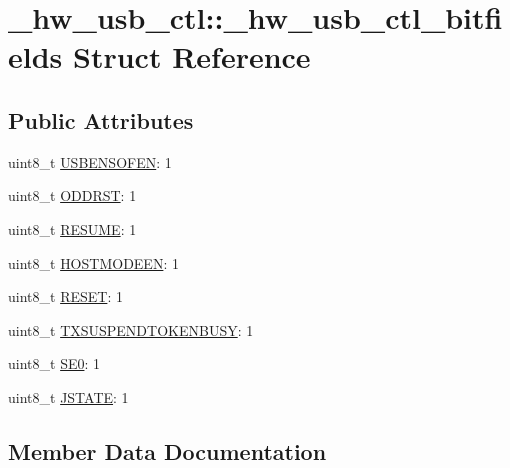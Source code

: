 \hypertarget{struct__hw__usb__ctl_1_1__hw__usb__ctl__bitfields}{}\section{\+\_\+hw\+\_\+usb\+\_\+ctl\+:\+:\+\_\+hw\+\_\+usb\+\_\+ctl\+\_\+bitfields Struct Reference}
\label{struct__hw__usb__ctl_1_1__hw__usb__ctl__bitfields}
\subsection*{Public Attributes}
\begin{DoxyCompactItemize}
\item 
uint8\+\_\+t \hyperlink{struct__hw__usb__ctl_1_1__hw__usb__ctl__bitfields_aec8cd251acc2ef4f7d8863919c100a56}{U\+S\+B\+E\+N\+S\+O\+F\+EN}\+: 1
\item 
uint8\+\_\+t \hyperlink{struct__hw__usb__ctl_1_1__hw__usb__ctl__bitfields_a8f8a58803504ce255c3294d585031de2}{O\+D\+D\+R\+ST}\+: 1
\item 
uint8\+\_\+t \hyperlink{struct__hw__usb__ctl_1_1__hw__usb__ctl__bitfields_acb3d2b4e6f759c4119af37f4e40a59e0}{R\+E\+S\+U\+ME}\+: 1
\item 
uint8\+\_\+t \hyperlink{struct__hw__usb__ctl_1_1__hw__usb__ctl__bitfields_ae55f823c8492bcc6298e9686146b0ac4}{H\+O\+S\+T\+M\+O\+D\+E\+EN}\+: 1
\item 
uint8\+\_\+t \hyperlink{struct__hw__usb__ctl_1_1__hw__usb__ctl__bitfields_acae4168ad4bf5dc7c1721d800a39c17c}{R\+E\+S\+ET}\+: 1
\item 
uint8\+\_\+t \hyperlink{struct__hw__usb__ctl_1_1__hw__usb__ctl__bitfields_a598e5316f44ae034098ae7c047238770}{T\+X\+S\+U\+S\+P\+E\+N\+D\+T\+O\+K\+E\+N\+B\+U\+SY}\+: 1
\item 
uint8\+\_\+t \hyperlink{struct__hw__usb__ctl_1_1__hw__usb__ctl__bitfields_ad71b5dbfb8c724674b591ad0c1149e29}{S\+E0}\+: 1
\item 
uint8\+\_\+t \hyperlink{struct__hw__usb__ctl_1_1__hw__usb__ctl__bitfields_a2d64df018d2c5ab5388f8d5a157b17f5}{J\+S\+T\+A\+TE}\+: 1
\end{DoxyCompactItemize}


\subsection{Member Data Documentation}
